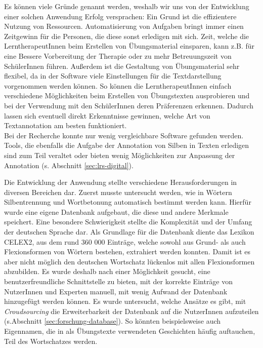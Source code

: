 Es können viele Gründe genannt werden, weshalb wir uns von der Entwicklung einer solchen Anwendung Erfolg versprachen: Ein Grund ist die effizientere Nutzung von Ressourcen. Automatisierung von Aufgaben bringt immer einen Zeitgewinn für die Personen, die diese sonst erledigen mit sich. Zeit, welche die LerntherapeutInnen beim Erstellen von Übungsmaterial einsparen, kann z.B. für eine Bessere Vorbereitung der Therapie oder zu mehr Betreuungszeit von SchülerInnen führen. Außerdem ist die Gestaltung von Übungsmaterial sehr flexibel, da in der Software viele Einstellungen für die Textdarstellung vorgenommen werden können. So können die LerntherapeutInnen einfach verschiedene Möglichkeiten beim Erstellen von Übungstexten ausprobieren und bei der Verwendung mit den SchülerInnen deren Präferenzen erkennen. Dadurch lassen sich eventuell direkt Erkenntnisse gewinnen, welche Art von Textannotation am besten funktioniert.\\
Bei der Recherche konnte nur wenig vergleichbare Software gefunden werden. Tools, die ebenfalls die Aufgabe der Annotation von Silben in Texten erledigen sind zum Teil veraltet oder bieten wenig Möglichkeiten zur Anpassung der Annotation (s. Abschnitt \ref{sec:lrs-digital}).

Die Entwicklung der Anwendung stellte verschiedene Herausforderungen in diversen Bereichen dar. Zuerst musste untersucht werden, wie in Wörtern Silbentrennung und Wortbetonung automatisch bestimmt werden kann. Hierfür wurde eine eigene Datenbank aufgebaut, die diese und andere Merkmale speichert. Eine besondere Schwierigkeit stellte die Komplexität und der Umfang der deutschen Sprache dar. Als Grundlage für die Datenbank diente das Lexikon CELEX2\cite{Burnage1990}, aus dem rund 360 000 Einträge, welche sowohl aus Grund- als auch Flexionsformen von Wörtern bestehen, extrahiert werden konnten. Damit ist es aber nicht möglich den deutschen Wortschatz lückenlos mit allen Flexionsformen abzubilden. Es wurde deshalb nach einer Möglichkeit gesucht, eine benutzerfreundliche Schnittstelle zu bieten, mit der korrekte Einträge von NutzerInnen und Experten manuell, mit wenig Aufwand der Datenbank hinzugefügt werden können. Es wurde untersucht, welche Ansätze es gibt, mit \textit{Croudsourcing} die Erweiterbarkeit der Datenbank auf die NutzerInnen aufzuteilen (s.Abschnitt \ref{sec:forschung-database}). So könnten beispielsweise auch Eigennamen, die in als Übungstexte verwendeten Geschichten häufig auftauchen, Teil des Wortschatzes werden.\\

